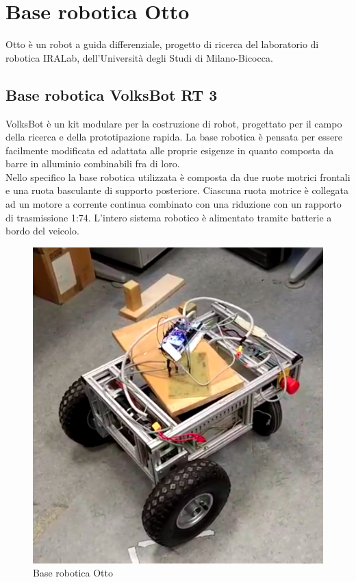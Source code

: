 \chapter{Base robotica Otto}

Otto è un robot a guida differenziale, progetto di ricerca del laboratorio di robotica IRALab, dell’Università degli Studi di Milano-Bicocca.

\section{Base robotica VolksBot RT 3}
VolksBot è un kit modulare per la costruzione di robot, progettato per il campo della ricerca e della  prototipazione rapida.
La base robotica è pensata per essere facilmente modificata ed adattata alle proprie esigenze in quanto composta da barre in alluminio combinabili fra di loro. \\
Nello specifico la base robotica utilizzata è composta da due ruote motrici frontali e una ruota basculante di supporto posteriore.
Ciascuna ruota motrice è collegata ad un motore a corrente continua combinato con una riduzione con un rapporto di trasmissione 1:74.
L'intero sistema robotico è alimentato tramite batterie a bordo del veicolo.
\begin{figure}[H]
\centering
\includegraphics[scale=0.4]{images/otto1.png}
\caption{Base robotica Otto}
\end{figure}

